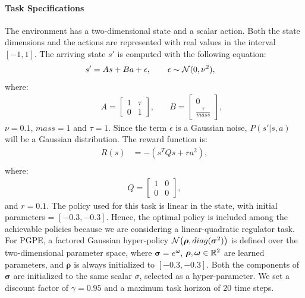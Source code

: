 \paragraph{Task Specifications} 
The environment has a two-dimensional state and a scalar action. 
Both the state dimensions and the actions are represented with real values in the interval $[-1, 1]$. The arriving state $s'$ is computed with the following equation:
\begin{align}
s' &= As + Ba + \epsilon, \qquad \epsilon\sim\mathcal{N}(0,\nu^2),\nonumber
\end{align}
where:
\begin{align}
&\quad A =
\begin{bmatrix}
1 & \tau \\
0 & 1 
\end{bmatrix}, &\quad 
B =
\begin{bmatrix}
0 \\
\frac{\tau}{mass} 
\end{bmatrix},\nonumber
\end{align}
$\nu=0.1$, $mass=1$ and $\tau = 1$.
Since the term $\epsilon$ is a Gaussian noise, $P(s'|s,a)$ will be a Gaussian distribution.
The reward function is:
\begin{align}
R(s) &= - (s^TQs + ra^2),\nonumber\\
\end{align}
where:
\begin{align}
Q =
\begin{bmatrix}
1 & 0 \\
0 & 0
\end{bmatrix},
\end{align}
and $r = 0.1 $.
The policy used for this task is linear in the state, with initial parameters = $[-0.3, -0.3]$. Hence, the optimal policy is included among the achievable policies because we are considering a linear-quadratic regulator task. For \ac{PGPE}, a factored Gaussian hyper-policy $\mathcal{N}\big(\boldsymbol{\rho},\mathop{diag}(\boldsymbol{\sigma}^2)\big)$ is defined over the two-dimensional parameter space, where $\boldsymbol{\sigma}=e^{\boldsymbol{\omega}}$, $\boldsymbol{\rho},\boldsymbol{\omega}\in\mathbb{R}^2$ are learned parameters, and $\boldsymbol{\rho}$ is always initialized to $[-0.3,-0.3]$. Both the components of $\boldsymbol{\sigma}$ are initialized to the same scalar $\sigma$, selected as a hyper-parameter. 
We set a discount factor of $\gamma=0.95$ and a maximum task horizon of $20$ time steps.
